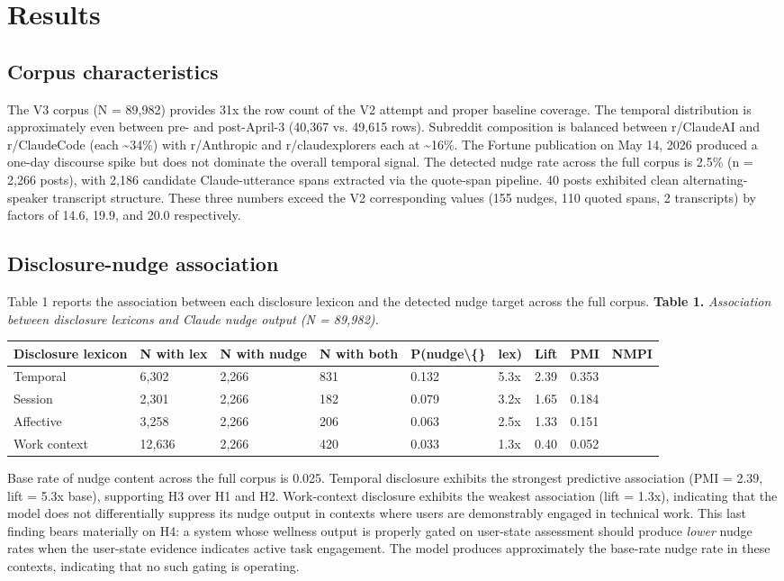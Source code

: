 \documentclass{obelus-preprint}
\begin{document}
\section{Results}
\subsection{Corpus characteristics}
The V3 corpus (N = 89,982) provides 31x the row count of the V2 attempt and proper baseline coverage. The temporal distribution is approximately even between pre- and post-April-3 (40,367 vs. 49,615 rows). Subreddit composition is balanced between r/ClaudeAI and r/ClaudeCode (each \textasciitilde{}34\%) with r/Anthropic and r/claudexplorers each at \textasciitilde{}16\%. The Fortune publication on May 14, 2026 produced a one-day discourse spike but does not dominate the overall temporal signal.
The detected nudge rate across the full corpus is 2.5\% (n = 2,266 posts), with 2,186 candidate Claude-utterance spans extracted via the quote-span pipeline. 40 posts exhibited clean alternating-speaker transcript structure. These three numbers exceed the V2 corresponding values (155 nudges, 110 quoted spans, 2 transcripts) by factors of 14.6, 19.9, and 20.0 respectively.
\subsection{Disclosure-nudge association}
Table 1 reports the association between each disclosure lexicon and the detected nudge target across the full corpus.
\textbf{Table 1.} \emph{Association between disclosure lexicons and Claude nudge output (N = 89,982).}
\begin{center}
\begin{tabular}{lllllllll}
\toprule
\textbf{Disclosure lexicon} & \textbf{N with lex} & \textbf{N with nudge} & \textbf{N with both} & \textbf{P(nudge\textbackslash\{\}} & \textbf{lex)} & \textbf{Lift} & \textbf{PMI} & \textbf{NMPI} \\
\midrule
Temporal & 6,302 & 2,266 & 831 & 0.132 & 5.3x & 2.39 & 0.353 &  \\
Session & 2,301 & 2,266 & 182 & 0.079 & 3.2x & 1.65 & 0.184 &  \\
Affective & 3,258 & 2,266 & 206 & 0.063 & 2.5x & 1.33 & 0.151 &  \\
Work context & 12,636 & 2,266 & 420 & 0.033 & 1.3x & 0.40 & 0.052 &  \\
\bottomrule
\end{tabular}
\end{center}
Base rate of nudge content across the full corpus is 0.025. Temporal disclosure exhibits the strongest predictive association (PMI = 2.39, lift = 5.3x base), supporting H3 over H1 and H2. Work-context disclosure exhibits the weakest association (lift = 1.3x), indicating that the model does not differentially suppress its nudge output in contexts where users are demonstrably engaged in technical work. This last finding bears materially on H4: a system whose wellness output is properly gated on user-state assessment should produce \emph{lower} nudge rates when the user-state evidence indicates active task engagement. The model produces approximately the base-rate nudge rate in these contexts, indicating that no such gating is operating.
\end{document}
